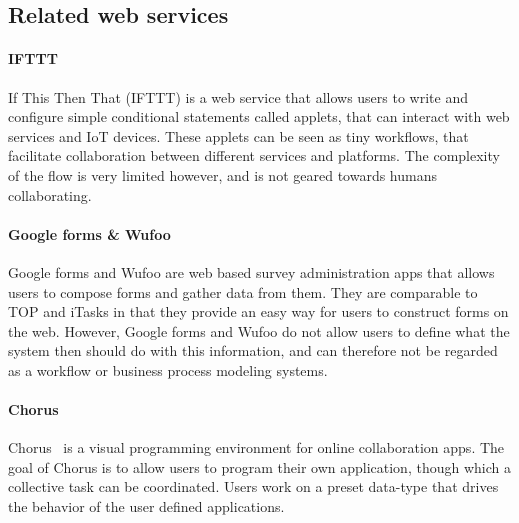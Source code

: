 \subsection{Related web services}


\paragraph{IFTTT}

If This Then That (IFTTT) is a web service that allows users to write and
configure simple conditional statements called applets, that can interact with
web services and IoT devices. These applets can be seen as tiny workflows, that
facilitate collaboration between different services and platforms. The
complexity of the flow is very limited however, and is not geared towards humans
collaborating.

\paragraph{Google forms \& Wufoo}

Google forms and Wufoo are web based survey administration apps that allows
users to compose forms and gather data from them. They are comparable to TOP and
iTasks in that they provide an easy way for users to construct forms on the web.
However, Google forms and Wufoo do not allow users to define what the system
then should do with this information, and can therefore not be regarded as a
workflow or business process modeling systems.

\paragraph{Chorus} %

Chorus~\cite{chen2017chorus} is a visual programming environment for online
collaboration apps. The goal of Chorus is to allow users to program their own
application, though which a collective task can be coordinated. Users work on a
preset data-type that drives the behavior of the user defined applications.
